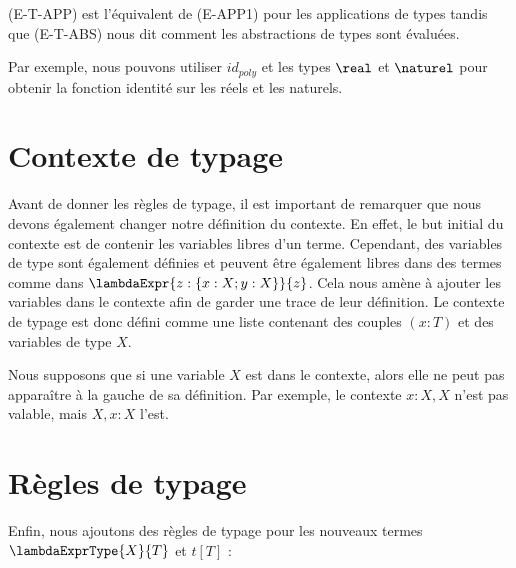 
(E-T-APP) est l'équivalent de (E-APP1) pour les applications de types tandis que
(E-T-ABS) nous dit comment les abstractions de types sont évaluées.

Par exemple, nous pouvons utiliser $id_{poly}$ et les types $\real$ et
$\naturel$ pour obtenir la fonction identité sur les réels et les naturels.


\section{Contexte de typage}

Avant de donner les règles de typage, il est important de remarquer que nous
devons également changer notre définition du contexte. En effet, le but initial
du contexte est de contenir les variables libres d'un terme. Cependant, des
variables de type sont également définies et peuvent être également libres dans des
termes comme dans $\lambdaExpr{z : \left\{ x : X ; y : X \right\}}{z}$.
Cela nous amène à ajouter les variables dans le contexte afin de garder une
trace de leur définition. Le contexte de typage
est donc défini comme une liste contenant des couples $(x : T)$ et des variables
de type $X$.

Nous supposons que si une variable $X$ est dans le contexte, alors elle ne peut
pas apparaître à la gauche de sa définition. Par exemple, le contexte $x : X, X$
n'est pas valable, mais $X, x : X$ l'est.

\section{Règles de typage}

Enfin, nous ajoutons des règles de typage pour les nouveaux termes
$\lambdaExprType{X}{T}$ et $t[T]$ :


